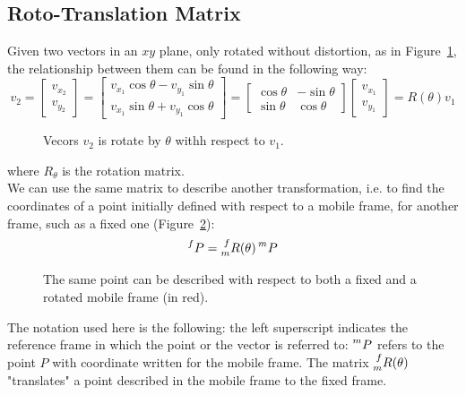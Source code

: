 \documentclass[a4paper,12pt,oneside]{report}
\begin{document}
\subsection{Roto-Translation Matrix}
Given two vectors in an $xy$ plane, only rotated without distortion, as in Figure~\ref{rotation_vectors}, the relationship between them can be found in the following way:
\begin{equation}
  v_2=\begin{bmatrix}
    v_{x_2}\\
    v_{y_2}
  \end{bmatrix}=\begin{bmatrix}
    v_{x_1}\cos{\theta}-v_{y_1}\sin{\theta}\\
    v_{x_1}\sin{\theta}+v_{y_1}\cos{\theta}
  \end{bmatrix}=\begin{bmatrix}
    \cos{\theta} & -\sin{\theta}\\
    \sin{\theta} & \cos{\theta}
  \end{bmatrix}\begin{bmatrix}
    v_{x_1}\\
    v_{y_1}
  \end{bmatrix}=R(\theta)v_1
  \label{rotation_matrix}
\end{equation}
\begin{figure}[h]
  \centering
  
  \caption{Vecors $v_2$ is rotate by $\theta$ withh respect to $v_1$.}
  \label{rotation_vectors}
\end{figure}
where $R_{\theta}$ is the rotation matrix.\\
We can use the same matrix to describe another transformation, i.e. to find the coordinates of a point initially defined with respect to a mobile frame, for another frame, such as a fixed one (Figure~\ref{rotation_point}):
\begin{equation}
  \prescript{f}{}{P}=\prescript{f}{m}{R(\theta)}\prescript{m}{}{P}
\end{equation}
\begin{figure}[h]
  \centering
  
  \caption{The same point can be described with respect to both a fixed and a rotated mobile frame (in red).}
  \label{rotation_point}
\end{figure}
The notation used here is the following: the left superscript indicates the reference frame in which the point or the vector is referred to: $\prescript{m}{}{P}$ refers to the point $P$ with coordinate written for the mobile frame. The matrix $\prescript{f}{m}{R(\theta)}$ "translates" a point described in the mobile frame to the fixed frame.\\
\end{document}
